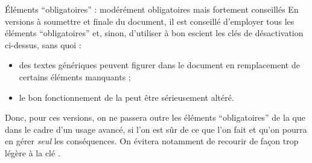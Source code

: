 \begin{dbwarning}{Éléments \enquote{obligatoires} : modérément obligatoires
    mais fortement conseillés}{}
  En versions à soumettre et finale du document, il est conseillé d'employer
  tous les éléments \enquote{obligatoires} et, sinon, d'utiliser à bon escient
  les clés de désactivation ci-dessus, sans quoi :
  \begin{itemize}
  \item des textes génériques peuvent figurer dans le document en remplacement
    de certains éléments manquants ;
  \item le bon fonctionnement de la \yatCl{} peut être sérieusement altéré.
  \end{itemize}
  Donc, pour ces versions, on ne passera outre les éléments
  \enquote{obligatoires} de la \yatCl{} que dans le cadre d'un usage avancé, si
  l'on est sûr de ce que l'on fait et qu'on pourra en gérer \emph{seul} les
  conséquences.  On évitera notamment de recourir de façon trop légère à la clé
  .
\end{dbwarning}

